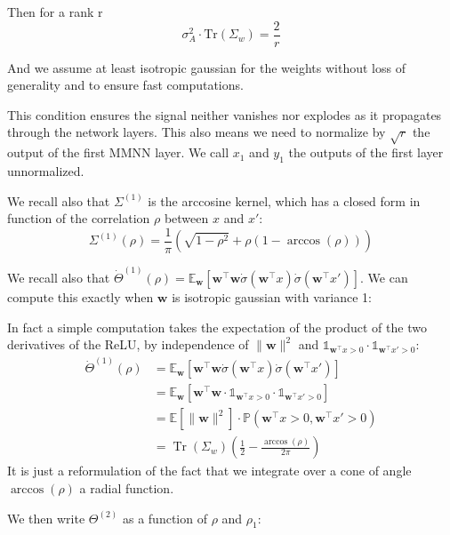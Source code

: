\documentclass[11pt, a4paper]{article}
\begin{document}
Then for a rank r
\begin{equation*}
    \sigma_A^2 \cdot \text{Tr}(\Sigma_w) = \frac{2}{r}
\end{equation*}

And we assume at least isotropic gaussian for the weights without loss of generality and to ensure fast computations.

This condition ensures the signal neither vanishes nor explodes as it propagates through the network layers.
This also means we need to normalize by $\sqrt{r}$ the output of the first MMNN layer.
We call $x_1$ and $y_1$ the outputs of the first layer unnormalized.

We recall also that $\Sigma^{(1)}$ is the arccosine kernel, which has a closed form in function of the correlation $\rho$ between $x$ and $x'$:
\[
\Sigma^{(1)}(\rho) =  \frac{1}{\pi}\left(\sqrt{1-\rho^2} + \rho(1-\arccos(\rho))\right)
\]

We recall also that $\dot{\Theta}^{(1)}(\rho) = \mathbb{E}_{\bm{w}} \left[  \bm{w}^\top \bm{w} \dot{\sigma}(\bm{w}^\top x) \dot{\sigma}(\bm{w}^\top x') \right]$. We can compute this exactly when $\bm{w}$ is isotropic gaussian with variance 1:




In fact a simple computation takes the expectation of the product of the two derivatives of the ReLU, by independence of $\|\bm{w}\|^2$ and $\mathbb{1}_{\bm{w}^\top x > 0} \cdot \mathbb{1}_{\bm{w}^\top x' > 0}$:
\begin{align*}
\dot{\Theta}^{(1)}(\rho) &= \mathbb{E}_{\bm{w}} \left[  \bm{w}^\top \bm{w} \dot{\sigma}(\bm{w}^\top x) \dot{\sigma}(\bm{w}^\top x') \right] \\
&= \mathbb{E}_{\bm{w}} \left[  \bm{w}^\top \bm{w} \cdot \mathbb{1}_{\bm{w}^\top x > 0} \cdot \mathbb{1}_{\bm{w}^\top x' > 0} \right] \\
&= \mathbb{E}\!\left[ \|\bm{w}\|^2 \right] \cdot \mathbb{P}(\bm{w}^\top x > 0, \bm{w}^\top x' > 0) \\
&= \operatorname{Tr}(\Sigma_w)\left(\frac{1}{2} - \frac{\arccos(\rho)}{2\pi}\right)
\end{align*}
It is just a reformulation of the fact that we integrate over a cone of angle $\arccos(\rho)$ a radial function.

We then write $\Theta^{(2)}$ as a function of $\rho$ and $\rho_1$:
\begin{center}
\end{center}
\end{document}
